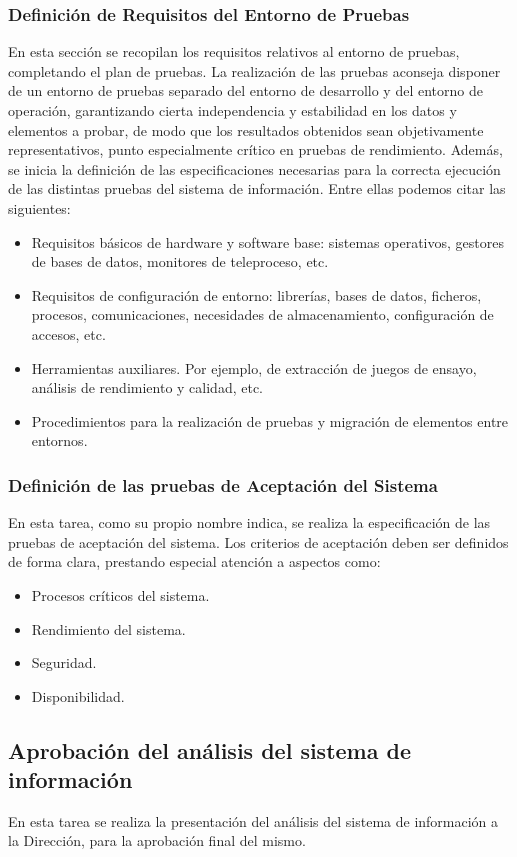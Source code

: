 \documentclass[11pt,a4paper,spanish,twoside]{report}
\begin{document}
\subsubsection{Definición de Requisitos del Entorno de Pruebas}
En esta sección se recopilan los requisitos relativos al entorno de pruebas,
completando el plan de pruebas. La realización de las pruebas aconseja
disponer de un entorno de pruebas separado del entorno de desarrollo y del
entorno de operación, garantizando cierta independencia y estabilidad en los
datos y elementos a probar, de modo que los resultados obtenidos sean
objetivamente representativos, punto especialmente crítico en pruebas de
rendimiento. Además, se inicia la definición de las especificaciones
necesarias para la correcta ejecución de las distintas pruebas del sistema de
información. Entre ellas podemos citar las siguientes:
\begin{itemize}
\item Requisitos básicos de hardware y software base: sistemas operativos,
  gestores de bases de datos, monitores de teleproceso, etc.
\item Requisitos de configuración de entorno: librerías, bases de datos,
  ficheros, procesos, comunicaciones, necesidades de almacenamiento,
  configuración de accesos, etc. 
\item Herramientas auxiliares. Por ejemplo, de extracción de juegos de
  ensayo, análisis de rendimiento y calidad, etc. 
\item Procedimientos para la realización de pruebas y migración de elementos
  entre entornos. 
\end{itemize}

\subsubsection{Definición de las pruebas de Aceptación del Sistema}
En esta tarea, como su propio nombre indica, se realiza la especificación
de las pruebas de aceptación del sistema. Los criterios de aceptación deben
ser definidos de forma clara, prestando especial atención a aspectos como: 
\begin{itemize}
\item Procesos críticos del sistema.
\item Rendimiento del sistema.
\item Seguridad.
\item Disponibilidad.
\end{itemize}

\subsection{Aprobación del análisis del sistema de información}
En esta tarea se realiza la presentación del análisis del sistema de
información a la Dirección, para la aprobación final del mismo.
\end{document}
